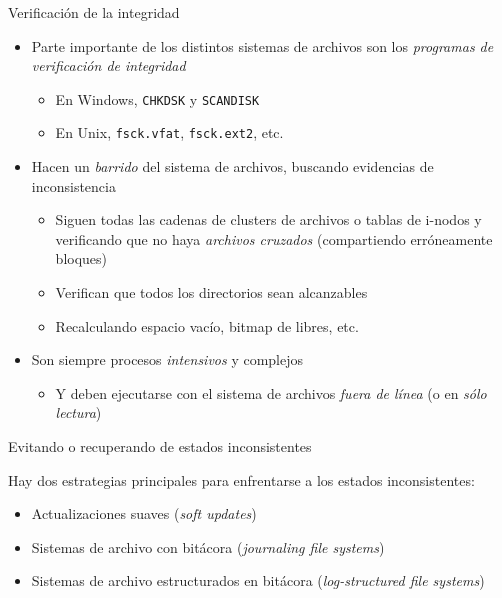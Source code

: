\documentclass[presentation]{beamer}
\begin{document}
\begin{frame}[label={sec:org2b32f43},fragile]{Verificación de la integridad}
 \begin{itemize}
\item Parte importante de los distintos sistemas de archivos son los
\emph{programas de verificación de integridad}
\begin{itemize}
\item En Windows, \texttt{CHKDSK} y \texttt{SCANDISK}
\item En Unix, \texttt{fsck.vfat}, \texttt{fsck.ext2}, etc.
\end{itemize}
\item Hacen un \emph{barrido} del sistema de archivos, buscando evidencias de
inconsistencia
\begin{itemize}
\item Siguen todas las cadenas de clusters de archivos o tablas de
i-nodos y verificando que no haya \emph{archivos cruzados}
(compartiendo erróneamente bloques)
\item Verifican que todos los directorios sean alcanzables
\item Recalculando espacio vacío, bitmap de libres, etc.
\end{itemize}
\item Son siempre procesos \emph{intensivos} y complejos
\begin{itemize}
\item Y deben ejecutarse con el sistema de archivos \emph{fuera de línea} (o
en \emph{sólo lectura})
\end{itemize}
\end{itemize}
\end{frame}

\begin{frame}[label={sec:orgd861af8}]{Evitando o recuperando de estados inconsistentes}
\begin{center}
Hay dos estrategias principales para enfrentarse a los estados
inconsistentes:
\end{center}
\begin{itemize}
\item Actualizaciones suaves (\emph{soft updates})
\item Sistemas de archivo con bitácora (\emph{journaling file systems})
\item Sistemas de archivo estructurados en bitácora (\emph{log-structured
file systems})
\end{itemize}
\end{frame}
\end{document}
